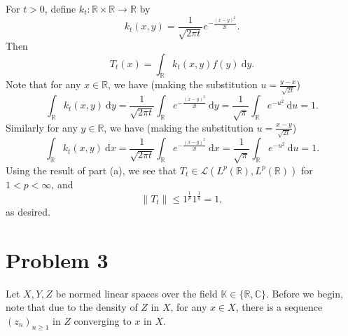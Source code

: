 \documentclass[11pt]{article}
\theoremstyle{thmstyle}
\theoremstyle{defstyle}
\newcommand{\R}{\mathbb{R}}
\newcommand{\bbC}{\mathbb{C}}
\newcommand{\K}{\mathbb{K}} %
\renewcommand{\le}{\leqslant}
\renewcommand{\ge}{\geqslant}
\newcommand{\calL}{\mathcal{L}}
\begin{document}
For $t > 0$, define $k_t\colon\R\times\R\to\R$ by 
\begin{equation*}
    k_t(x, y)  = \frac{1}{\sqrt{2\pi t}}e^{-\frac{(x - y)^2}{2t}}.
\end{equation*}
Then 
\begin{equation*}
    T_t(x) = \int_{\R} k_t(x, y)f(y)~\mathrm dy. %
\end{equation*}
Note that for any $x\in\R$, we have (making the substitution $u = \frac{y - x}{\sqrt{2t}}$)
\begin{equation*}
    \int_\R k_t(x, y)~\mathrm dy = \frac{1}{\sqrt{2\pi t}}\int_\R e^{-\frac{(x - y)^2}{2t}}~\mathrm dy = \frac{1}{\sqrt{\pi}}\int_{\R} e^{-u^2}~\mathrm du = 1.
\end{equation*}
Similarly for any $y\in\R$, we have (making the substitution $u = \frac{x - y}{\sqrt{2t}}$)
\begin{equation*}
    \int_\R k_t(x, y)~\mathrm dx  = \frac{1}{\sqrt{2\pi t}} \int_\R e^{-\frac{(x - y)^2}{2t}}~\mathrm dx = \frac{1}{\sqrt{\pi}}\int_{\R} e^{-u^2}~\mathrm du = 1.
\end{equation*}
Using the result of part (a), we see that $T_t\in\calL\left(L^p(\R), L^p(\R)\right)$ for $1 < p < \infty$, and 
\begin{equation*}
    \|T_t\|\le 1^{\frac{1}{p}}1^{\frac{1}{q}} = 1,
\end{equation*}
as desired.

\section{Problem 3}

Let $X, Y, Z$ be normed linear spaces over the field $\K\in\{\R, \bbC\}$. Before we begin, note that due to the density of $Z$ in $X$, for any $x\in X$, there is a sequence $(z_n)_{n\ge 1}$ in $Z$ converging to $x$ in $X$.
\end{document}
